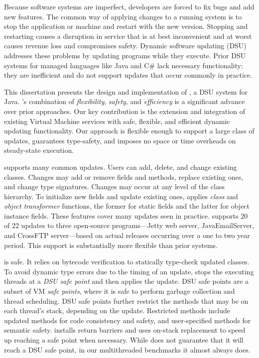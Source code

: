 Because software systems are imperfect, developers are forced to fix bugs
and add new features. The common way of applying changes to a running
system is to stop the application or machine and restart with the new
version. Stopping and restarting causes a disruption in service that is at
best inconvenient and at worst causes revenue loss and compromises safety.
Dynamic software updating (DSU) addresses these problems by updating
programs while they execute. Prior DSU systems for managed languages like
Java and C\# lack necessary functionality: they are inefficient and do not
support updates that occur commonly in practice.

This dissertation presents the design and implementation of \JV, a DSU
system for Java. \JV's combination of \emph{flexibility}, \emph{safety},
and \emph{efficiency} is a significant advance over prior approaches.  Our
key contribution is the extension and integration of existing Virtual
Machine services with safe, flexible, and efficient dynamic updating
functionality.  Our approach is flexible enough to support a large class of
updates, guarantees type-safety, and imposes no space or time overheads on
steady-state execution.

\JV supports many common updates. Users can add, delete, and change
existing classes.  Changes may add or remove fields and methods, replace
existing ones, and change type signatures.  Changes may occur at any level
of the class hierarchy.  To initialize new fields and update existing ones,
\JV applies \emph{class} and \emph{object transformer} functions, the
former for static fields and the latter for object instance fields.  These
features cover many updates seen in practice.  \JV supports 20
of 22 updates to three open-source programs---Jetty web server,
JavaEmailServer, and CrossFTP server---based on actual releases occurring
over a one to two year period. This support is substantially more flexible
than prior systems.

\JV is safe. It relies on bytecode verification to statically type-check
updated classes.  To avoid dynamic type errors due to the timing of an
update, \JV stops the executing threads at a \emph{DSU safe point} and then
applies the update. DSU safe points are a subset of VM \emph{safe points},
where it is safe to perform garbage collection and thread scheduling.  DSU
safe points further restrict the methods that may be on each thread's
stack, depending on the update.  Restricted methods include updated methods
for code consistency and safety, and user-specified methods for semantic
safety. \JV installs return barriers and uses on-stack replacement to speed
up reaching a safe point when necessary.  While \JV does not guarantee that
it will reach a DSU safe point, in our multithreaded benchmarks it almost
always does.

